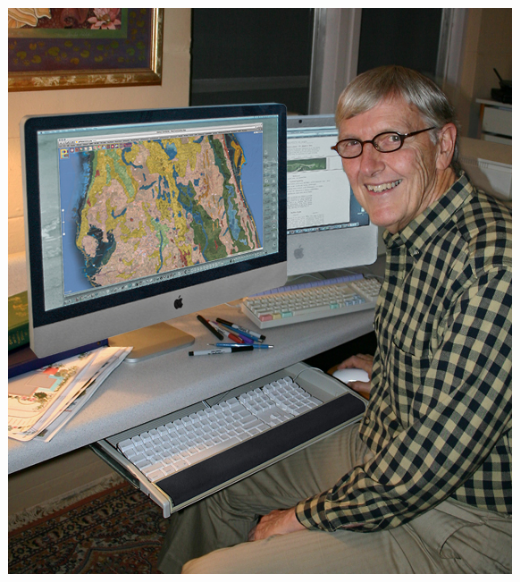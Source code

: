 \documentclass[../r.tex]{subfiles}
\begin{document}
\href{http://perfectenvirons.com/About_The_Designer.html}{\includegraphics[scale=0.3]{../fun/Michael_Clendenin_Miller564x633.jpg}}

\end{document}
